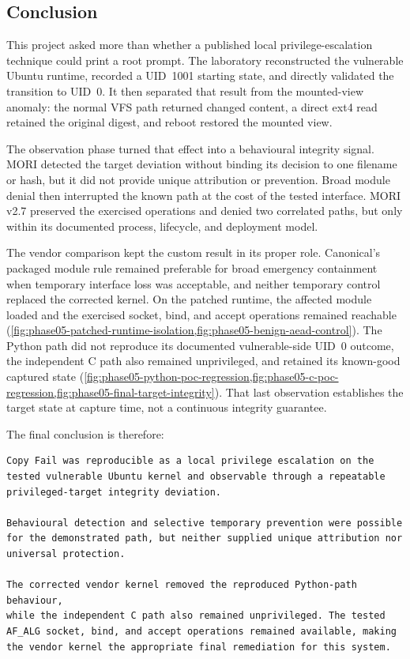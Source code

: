 \subsection{Conclusion}

This project asked more than whether a published local privilege-escalation
technique could print a root prompt. The laboratory reconstructed the vulnerable
Ubuntu runtime, recorded a UID~1001 starting state, and directly validated the
transition to UID~0. It then separated that result from the mounted-view anomaly:
the normal VFS path returned changed content, a direct ext4 read retained the
original digest, and reboot restored the mounted view.

The observation phase turned that effect into a behavioural integrity signal.
MORI detected the target deviation without binding its decision to one filename
or hash, but it did not provide unique attribution or prevention. Broad module
denial then interrupted the known path at the cost of the tested interface.
MORI v2.7 preserved the exercised operations and denied two correlated paths,
but only within its documented process, lifecycle, and deployment model.

The vendor comparison kept the custom result in its proper role. Canonical's
packaged module rule remained preferable for broad emergency containment when
temporary interface loss was acceptable, and neither temporary control replaced
the corrected kernel. On the patched runtime, the affected module loaded and
the exercised socket, bind, and accept operations remained reachable
(\cref{fig:phase05-patched-runtime-isolation,fig:phase05-benign-aead-control}).
The Python path did not reproduce its documented vulnerable-side UID~0 outcome,
the independent C path also remained unprivileged, and 
retained its known-good captured state
(\cref{fig:phase05-python-poc-regression,fig:phase05-c-poc-regression,fig:phase05-final-target-integrity}).
That last observation establishes the target state at capture time, not a
continuous integrity guarantee.

The final conclusion is therefore:

\begin{lstlisting}
Copy Fail was reproducible as a local privilege escalation on the
tested vulnerable Ubuntu kernel and observable through a repeatable
privileged-target integrity deviation.

Behavioural detection and selective temporary prevention were possible
for the demonstrated path, but neither supplied unique attribution nor
universal protection.

The corrected vendor kernel removed the reproduced Python-path behaviour,
while the independent C path also remained unprivileged. The tested
AF_ALG socket, bind, and accept operations remained available, making
the vendor kernel the appropriate final remediation for this system.
\end{lstlisting}

